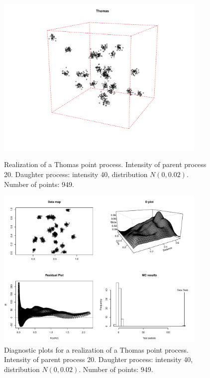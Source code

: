 \documentclass{article}
\begin{document}
\begin{figure}[p]
  \centering
    \includegraphics[width=0.9\textwidth]{PP_Thomas_20_40_0p02_949.pdf}
  \caption{Realization of a Thomas point process. Intensity of parent process 20. Daughter process: intensity 40, distribution $N(0,0.02)$. Number of points: 949.}
  \label{fig:thomasPP}

\vspace*{\floatsep}

    \includegraphics[width=0.9\textwidth]{diag_Thomas_20_40_0p02_949.pdf}
  \caption{Diagnostic plots for a realization of a Thomas point process. Intensity of parent process 20. Daughter process: intensity 40, distribution $N(0,0.02)$. Number of points: 949.}
  \label{fig:thomasDiag}
\end{figure}
\end{document}
